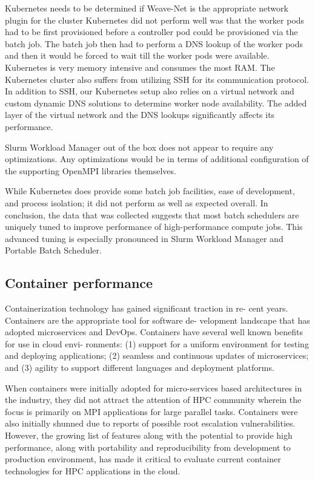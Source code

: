 \documentclass[conference]{IEEEtran}
\begin{document}
Kubernetes needs to be determined if Weave-Net is the appropriate network plugin for the cluster
Kubernetes did not perform well was that the worker pods had to be first provisioned
before a controller pod could be provisioned via the batch job. The batch job then had to
perform a DNS lookup of the worker pods and then it would be forced to wait till the
worker pods were available.
Kubernetes is very memory intensive and consumes the most RAM.
The Kubernetes cluster also suffers from utilizing SSH for its communication protocol.
In addition to SSH, our Kubernetes setup also relies on a virtual network and custom
dynamic DNS solutions to determine worker node availability. The added layer of the
virtual network and the DNS lookups significantly affects its performance.


Slurm Workload Manager out of the box does not appear to require any optimizations.
Any optimizations would be in terms of additional configuration of the supporting
OpenMPI libraries themselves.



While Kubernetes does provide some batch job facilities, ease of development, and process isolation; it did not perform as well as expected overall. In conclusion, the data that was collected suggests that most batch schedulers are uniquely tuned to improve performance of high-performance compute jobs. This advanced tuning is especially pronounced in Slurm Workload Manager and Portable Batch Scheduler.


\subsection{Container performance}
Containerization technology has gained significant traction in re-
cent years. Containers are the appropriate tool for software de-
velopment landscape that has adopted microservices and DevOps.
Containers have several well known benefits for use in cloud envi-
ronments: (1) support for a uniform environment for testing and
deploying applications; (2) seamless and continuous updates of
microservices; and (3) agility to support different languages and
deployment platforms.

When containers were initially adopted for micro-services based
architectures in the industry, they did not attract the attention of
HPC community wherein the focus is primarily on MPI applications
for large parallel tasks. Containers were also initially shunned
due to reports of possible root escalation vulnerabilities. However,
the growing list of features along with the potential to provide
high performance, along with portability and reproducibility from
development to production environment, has made it critical to
evaluate current container technologies for HPC applications in
the cloud.
\end{document}
